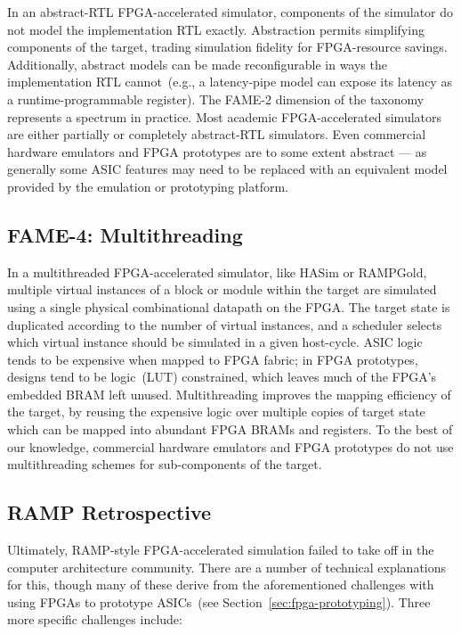 In an abstract-RTL FPGA-accelerated simulator, components of the simulator do
not model the implementation RTL exactly. Abstraction permits simplifying
components of the target, trading simulation fidelity for FPGA-resource
savings. Additionally, abstract models can be made reconfigurable in ways the
implementation RTL cannot~(e.g., a latency-pipe model can expose its latency
as a runtime-programmable register).  The FAME-2 dimension of the taxonomy
represents a spectrum in practice.  Most academic FPGA-accelerated simulators
are either partially or completely abstract-RTL simulators.  Even commercial
hardware emulators and FPGA prototypes are to some extent abstract --- as
generally some ASIC features may need to be replaced with an equivalent model
provided by the emulation or prototyping platform.

\subsection{FAME-4: Multithreading}

In a multithreaded FPGA-accelerated simulator, like HASim or RAMPGold, multiple virtual instances of a
block or module within the target are simulated using a single physical
combinational datapath on the FPGA. The target state is duplicated according to the number of
virtual instances, and a scheduler selects which virtual instance should be
simulated in a given host-cycle. ASIC logic tends to be expensive when mapped
to FPGA fabric; in FPGA prototypes, designs tend to be logic~(LUT) constrained,
which leaves much of the FPGA's embedded BRAM left unused.  Multithreading
improves the mapping efficiency of the target, by reusing the expensive logic
over multiple copies of target state which can be mapped into abundant FPGA BRAMs and registers.
To the best of our knowledge, commercial hardware
emulators and FPGA prototypes do not use multithreading schemes for sub-components of the target.

\subsection{RAMP Retrospective}

Ultimately, RAMP-style FPGA-accelerated simulation failed to take off
in the computer architecture community. There are a number of technical explanations for this, though many of these
derive from the aforementioned challenges with using FPGAs to prototype ASICs~(see Section~\ref{sec:fpga-prototyping}).
Three more specific challenges include:


